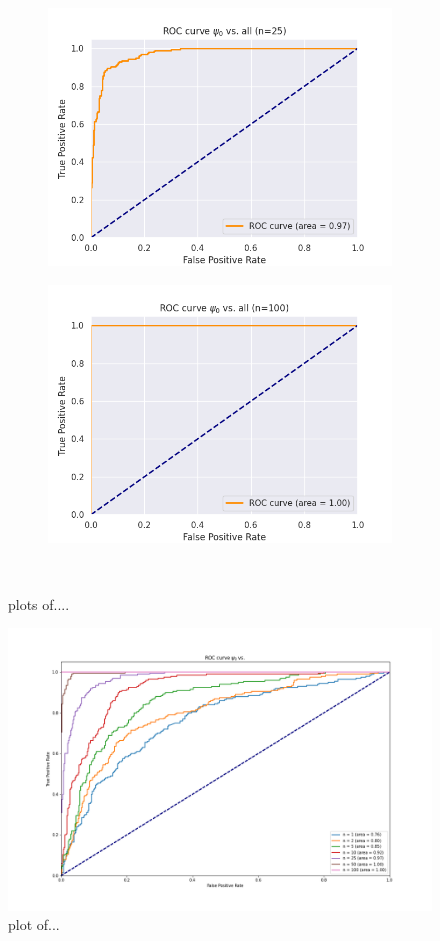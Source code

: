 \begin{figure}[htb]
\begin{subfigure}{.33\textwidth}
		\includegraphics[width=1\linewidth]{figures/AUROC_600samples_class0_llh_n25}
		\caption{}
		\label{fig:sfig2}
	\end{subfigure}
	\begin{subfigure}{.33\textwidth}
		\centering
		\includegraphics[width=1\linewidth]{figures/AUROC_600samples_class0_llh_n100}
		\caption{}
		\label{fig:sfig2}
	\end{subfigure}\\
	\caption{plots of....}
	\label{fig:fig}
\end{figure}
\begin{figure}[htb]
	\begin{center}
		\includegraphics[width=.9\textwidth]{figures/all_particlefilter}
		\caption{plot of...}
		\label{fig:traj}
	\end{center}
\end{figure}

